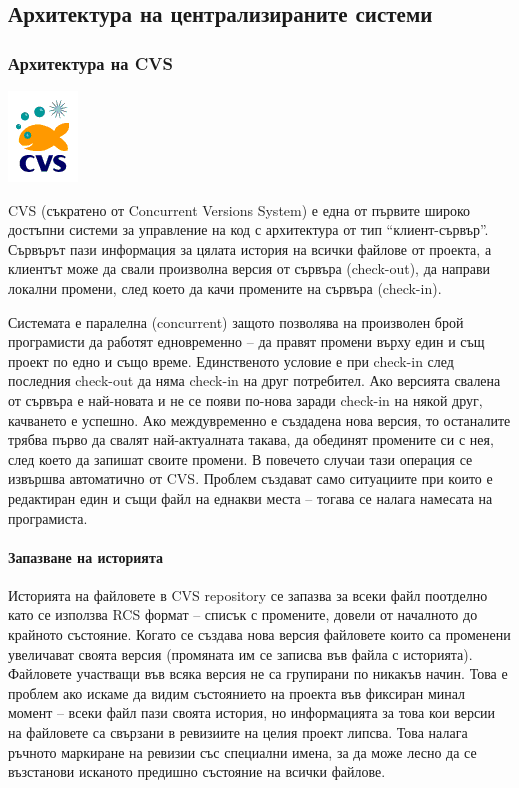 \documentclass[a4paper]{article}
\begin{document}
  \subsection{Архитектура на централизираните системи}
    \subsubsection{Архитектура на CVS}
    \includegraphics[scale=0.8]{cvs_icon}

    CVS (съкратено от Concurrent Versions System) е една от първите широко
    достъпни системи за управление на код с архитектура от тип
    ``клиент-сървър''\cite{client-server}. Сървърът пази информация за цялата
    история на всички файлове от проекта, а клиентът може да свали произволна
    версия от сървъра (check-out), да направи локални промени, след което да
    качи промените на сървъра (check-in).

    Системата е паралелна (concurrent) защото позволява на произволен брой
    програмисти да работят едновременно -- да правят промени върху един и същ
    проект по едно и също време. Единственото условие е при check-in след
    последния check-out да няма check-in на друг потребител. Ако версията
    свалена от сървъра е най-новата и не се появи по-нова заради check-in на
    някой друг, качването е успешно. Ако междувременно е създадена нова версия,
    то останалите трябва първо да свалят най-актуалната такава, да обединят
    промените си с нея, след което да запишат своите промени. В повечето случаи
    тази операция се извършва автоматично от CVS.  Проблем създават само
    ситуациите при които е редактиран един и същи файл на еднакви места --
    тогава се налага намесата на програмиста.

      \paragraph{Запазване на историята}

      Историята на файловете в CVS repository се запазва за всеки файл
      поотделно като се използва RCS формат -- списък с промените, довели от
      началното до крайното състояние. Когато се създава нова версия файловете
      които са променени увеличават своята версия (промяната им се записва във
      файла с историята). Файловете участващи във всяка версия не са групирани
      по никакъв начин. Това е проблем ако искаме да видим състоянието на
      проекта във фиксиран минал момент -- всеки файл пази своята история, но
      информацията за това кои версии на файловете са свързани в ревизиите на
      целия проект липсва. Това налага ръчното маркиране на ревизии със
      специални имена, за да може лесно да се възстанови исканото предишно
      състояние на всички файлове.
\end{document}
